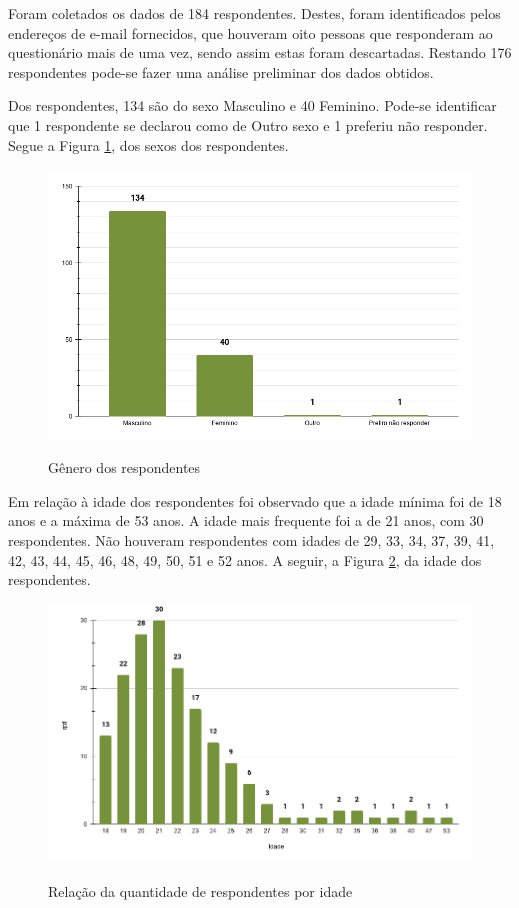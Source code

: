 \begin{apendicesenv}
Foram coletados os dados de 184 respondentes. Destes, foram identificados pelos endereços de e-mail fornecidos, que houveram oito pessoas que responderam ao questionário mais de uma vez, sendo assim estas foram descartadas. Restando 176 respondentes pode-se fazer uma análise preliminar dos dados obtidos. 

Dos respondentes, 134 são do sexo Masculino e 40 Feminino. Pode-se identificar que 1 respondente se declarou como de Outro sexo e 1 preferiu não responder. Segue a Figura \ref{Fig:genero.png}, dos sexos dos respondentes.

\begin{figure}[htbp]
	\centering
	\caption{Gênero dos respondentes}
	\includegraphics[keepaspectratio=true,scale=0.51]{figuras/apendice/graficos_survey/genero.png}
	\label{Fig:genero.png}
\end{figure}

Em relação à idade dos respondentes foi observado que a idade mínima foi de 18 anos e a máxima de 53 anos. A idade mais frequente foi a de 21 anos, com 30 respondentes. Não houveram respondentes com idades de 29, 33, 34, 37, 39, 41, 42, 43, 44, 45, 46, 48, 49, 50, 51 e 52 anos. A seguir, a Figura \ref{Fig:idade.png}, da idade dos respondentes.

\begin{figure}[htbp]
	\centering
	\caption{Relação da quantidade de respondentes por idade}
	\includegraphics[keepaspectratio=true,scale=0.51]{figuras/apendice/graficos_survey/idade.png}
	\label{Fig:idade.png}
\end{figure}


\end{apendicesenv}
